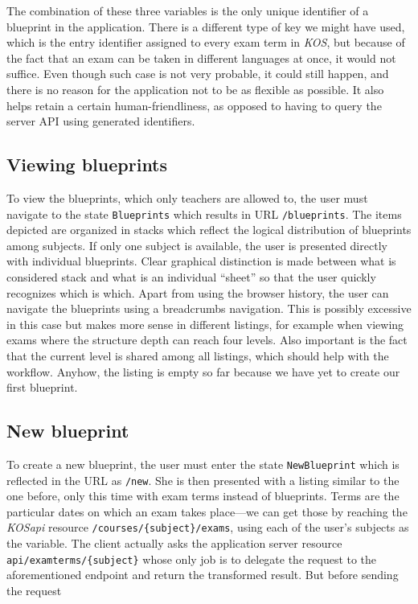 \documentclass[thesis=M,english,hidelinks]{FITthesis}[2012/10/20]
\newcommand{\code}{\texttt}
\begin{document}
The combination of these three variables is the only unique identifier of a blueprint in the application. There is a different type of key we might have used, which is the entry identifier assigned to every exam term in \textit{KOS}, but because of the fact that an exam can be taken in different languages at once, it would not suffice. Even though such case is not very probable, it could still happen, and there is no reason for the application not to be as flexible as possible. It also helps retain a certain human-friendliness, as opposed to having to query the server API using generated identifiers.

\subsection{Viewing blueprints}

To view the blueprints, which only teachers are allowed to, the user must navigate to the state \code{Blueprints} which results in URL \code{/blueprints}. The items depicted are organized in stacks which reflect the logical distribution of blueprints among subjects. If only one subject is available, the user is presented directly with individual blueprints. Clear graphical distinction is made between what is considered stack and what is an individual ``sheet'' so that the user quickly recognizes which is which. Apart from using the browser history, the user can navigate the blueprints using a breadcrumbs navigation. This is possibly excessive in this case but makes more sense in different listings, for example when viewing exams where the structure depth can reach four levels. Also important is the fact that the current level is shared among all listings, which should help with the workflow. Anyhow, the listing is empty so far because we have yet to create our first blueprint.

\subsection{New blueprint}

To create a new blueprint, the user must enter the state \code{NewBlueprint} which is reflected in the URL as \code{/new}. She is then presented with a listing similar to the one before, only this time with exam terms instead of blueprints. Terms are the particular dates on which an exam takes place---we can get those by reaching the \textit{KOSapi} resource \code{/courses/\{subject\}/exams}, using each of the user's subjects as the variable. The client actually asks the application server resource \code{api/examterms/\{subject\}} whose only job is to delegate the request to the aforementioned endpoint and return the transformed result. But before sending the request
\end{document}
